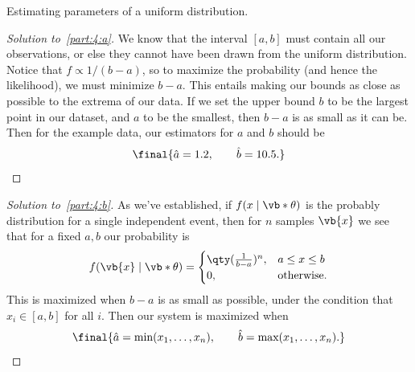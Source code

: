 \documentclass[10pt, physics]{homework}
\begin{document}
	\begin{problem}
		Estimating parameters of a uniform distribution.
	\end{problem}
	\begin{proof}[Solution to~\ref{part:4:a}]
		We know that the interval $[a,b]$ must contain all our observations, or else they cannot have been drawn from the uniform distribution.
		Notice that $f \propto 1/(b-a)$, so to maximize the probability (and hence the likelihood), we must minimize $b-a$.
		This entails making our bounds as close as possible to the extrema of our data.
		If we set the upper bound $b$ to be the largest point in our dataset, and $a$ to be the smallest, then $b-a$ is as small as it can be.
		Then for the example data, our estimators for $a$ and $b$ should be
		\[ \final{\hat{a} = 1.2,\qquad\hat{b}=10.5.}\qedhere \]
	\end{proof}
	\begin{proof}[Solution to~\ref{part:4:b}]
		As we've established, if $f(x \mid \vb*{\theta})$ is the probably distribution for a single independent event, then for $n$ samples $\vb{x}$ we see that for a fixed $a,b$ our probability is
		\[  
			f(\vb{x} \mid \vb*{\theta}) = \begin{cases}
				\qty(\frac{1}{b-a})^n, & a \leq x \leq b \\
				0, & \text{otherwise}.
			\end{cases}	
		\]
		This is maximized when $b-a$ is as small as possible, under the condition that $x_i \in [a,b]$ for all $i$.
		Then our system is maximized when
		\[ \final{\hat{a} = \text{min}(x_1,\dots,x_n),\qquad\hat{b} = \text{max}(x_1,\dots,x_n).}\qedhere \]
	\end{proof}
\end{document}

